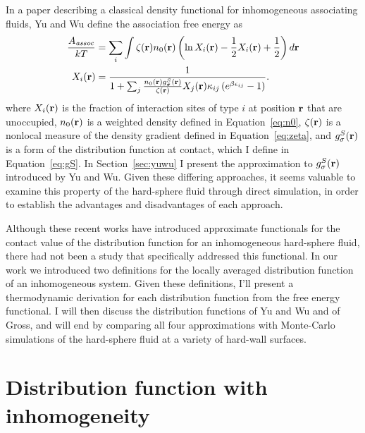 In a paper describing a classical density functional for
inhomogeneous associating
fluids\cite{yu2002fmt-dft-inhomogeneous-associating}, Yu and Wu define
the association free energy as
\begin{align}
  \frac{A_\textit{assoc}}{kT} &= \sum_i \int \zeta(\textbf{r})n_0(\textbf{r}) \left(\ln X_i(\textbf{r}) - \frac12
  X_i(\textbf{r}) + \frac12\right) d\textbf{r} \label{eq:Aassoc} \\
  X_i(\textbf{r}) &= \frac{1}{1 + \sum_j \frac{n_0(\textbf{r}) g_\sigma^{S}(\textbf{r})}{\zeta(\textbf{r})}
                                 X_j(\textbf{r})\kappa_{ij} \left(e^{\beta
                                   \epsilon_{ij}}-1\right)}.
  \label{eq:X}
\end{align}
where $X_i(\textbf{r})$ is the fraction of interaction sites of type $i$ at
position $\textbf{r}$ that are unoccupied, $n_0(\textbf{r})$ is a weighted density
defined in Equation~\ref{eq:n0}, $\zeta(\textbf{r})$ is a nonlocal measure of
the density gradient defined in Equation~\ref{eq:zeta}, and
$g_\sigma^S(\textbf{r})$ is a form of the distribution function at contact,
which I define in Equation~\ref{eq:gS}.  In Section~\ref{sec:yuwu} I
present the approximation to $g_\sigma^S(\textbf{r})$ introduced by Yu and
Wu.  Given these differing approaches, it seems valuable to examine
this property of the hard-sphere fluid through direct simulation, in
order to establish the advantages and disadvantages of each approach.

Although these recent works have introduced approximate functionals
for the contact value of the distribution function for an
inhomogeneous hard-sphere
fluid\cite{yu2002fmt-dft-inhomogeneous-associating, gross2009density},
there had not been a study that specifically addressed this
functional.
%
In our work we introduced two definitions for the locally averaged
distribution function of an inhomogeneous system.
%
%
Given these definitions, I'll present a thermodynamic derivation for
each distribution function from the free energy functional.  I will
then discuss the distribution functions of Yu and Wu and of Gross, and
will end by comparing all four approximations with Monte-Carlo
simulations of the hard-sphere fluid at a variety of hard-wall
surfaces.


\section{Distribution function with inhomogeneity}

